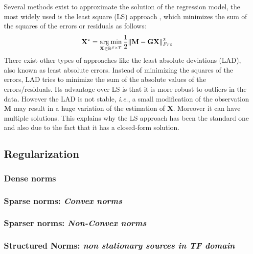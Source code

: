 Several methods exist to approximate the solution of the regression model, the most widely used is the least square (LS) approach \cite{legendre1805nouvelles}, which minimizes the sum of the squares of the errors or residuals as follows:
\begin{equation} \label{eq_ls}
	\mathbf{X^\star} = \mathop{\mathrm{arg}\,\mathrm{min}}_{\mathbf{X}\in \mathbb{R}^{S\times T}}\frac{1}{2} \|\mathbf{M}-\mathbf{GX}\|_{Fro}^2
\end{equation}
There exist other types of approaches like the least absolute deviations (LAD), also known as least absolute errors. Instead of minimizing the squares of the errors, LAD tries to minimize the sum of the absolute values of the errors/residuals. Its advantage over LS is that it is more robust to outliers in the data. However the LAD is not stable, \textit{i.e.}, a small modification of the observation $\mathbf{M}$ may result in a huge variation of the estimation of $\mathbf{X}$. Moreover it can have multiple solutions. This explains why the LS approach has been the standard one and also due to the fact that it has a closed-form solution.

\subsection{Regularization}
\subsubsection*{Dense norms}
\subsubsection*{Sparse norms: \textit{Convex norms}}
\subsubsection*{Sparser norms: \textit{Non-Convex norms}}
\subsubsection*{Structured Norms: \textit{non stationary sources in TF domain}}

